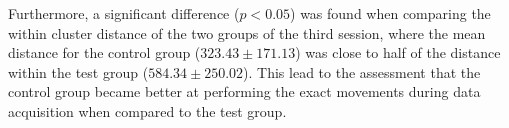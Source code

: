 Furthermore, a significant difference ($p < 0.05$) was found when comparing the within cluster distance of the two groups of the third session, where the mean distance for the control group ($323.43 \pm 171.13$) was close to half of the distance within the test group ($584.34 \pm 250.02$). This lead to the assessment that the control group became better at performing the exact movements during data acquisition when compared to the test group.%

